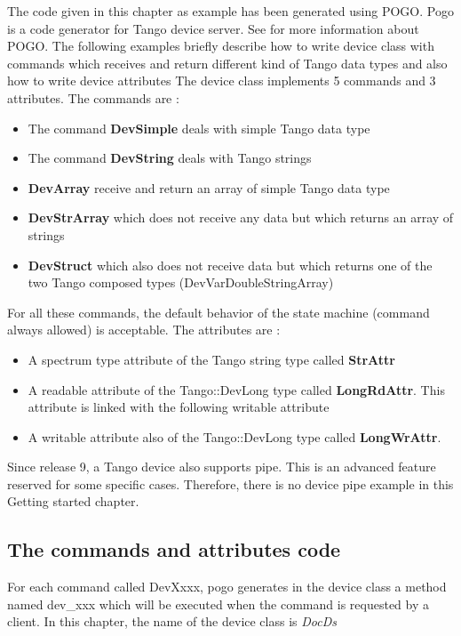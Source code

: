 The code given in this chapter as example has been generated using
POGO. Pogo is a code generator for Tango device server.
See \cite{Pogo doc} for more information about POGO. The following
examples briefly describe how to write device class with commands
which receives and return different kind of Tango data types and also
how to write device attributes The device class
implements 5 commands and 3 attributes. The commands are :
\begin{itemize}
\item The command \textbf{DevSimple} deals with simple Tango data type
\item The command \textbf{DevString} deals with Tango strings
\item \textbf{DevArray} receive and return an array of simple Tango data
type
\item \textbf{DevStrArray} which does not receive any data but which returns
an array of strings
\item \textbf{DevStruct} which also does not receive data but which returns
one of the two Tango composed types (DevVarDoubleStringArray)
\end{itemize}
For all these commands, the default behavior of the state machine
(command always allowed) is acceptable. The attributes are :
\begin{itemize}
\item A spectrum type attribute of the Tango string type called \textbf{StrAttr}
\item A readable attribute of the Tango::DevLong type called \textbf{LongRdAttr}.
This attribute is linked with the following writable attribute
\item A writable attribute also of the Tango::DevLong type called \textbf{LongWrAttr}.
\end{itemize}
Since release 9, a Tango device also supports pipe. This is an advanced
feature reserved for some specific cases. Therefore, there is no device
pipe example in this \textquotedbl{}Getting started\textquotedbl{}
chapter.

\subsection{The commands and attributes code}

For each command called DevXxxx, pogo generates in the device class
a method named dev\_xxx which will be executed when the command is
requested by a client. In this chapter, the name of the device class
is \emph{DocDs}

